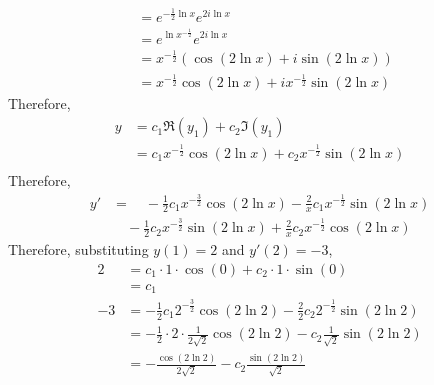 \documentclass[fleqn, a4paper, 11pt, oneside]{amsart}
\theoremstyle{definition}
\theoremstyle{theorem}
\begin{document}
\begin{solution}
\begin{enumerate}[leftmargin = *]
\begin{align*}
                                    & = e^{-\frac{1}{2} \ln x} e^{2 i \ln x}                             \\
                                    & = e^{\ln x^{-\frac{1}{2}}} e^{2 i \ln x}                           \\
                                    & = x^{-\frac{1}{2}} \left( \cos(2 \ln x) + i \sin (2 \ln x) \right) \\
                                    & = x^{-\frac{1}{2}} \cos(2 \ln x) + i x^{-\frac{1}{2}} \sin(2 \ln x)
			\end{align*}
			Therefore,
			\begin{align*}
				y & = c_1 \Re(y_1) + c_2 \Im(y_1)                                             \\
                                  & = c_1 x^{-\frac{1}{2}} \cos(2 \ln x) + c_2 x^{-\frac{1}{2}} \sin(2 \ln x) \\
			\end{align*}
			Therefore,
			\begin{align*}
				y' & = \quad -\frac{1}{2} c_1 x^{-\frac{3}{2}} \cos(2 \ln x) - \frac{2}{x} c_1 x^{-\frac{1}{2}} \sin(2 \ln x) \\
                                   & \quad -\frac{1}{2} c_2 x^{-\frac{3}{2}} \sin(2 \ln x) + \frac{2}{x} c_2 x^{-\frac{1}{2}} \cos(2 \ln x)
			\end{align*}
			Therefore, substituting $y(1) = 2$ and $y'(2) = -3$,
			\begin{align*}
				2                                                                       & = c_1 \cdot 1 \cdot \cos(0) + c_2 \cdot 1 \cdot \sin(0)                                                \\
                                                                                                        & = c_1                                                                                                  \\
				-3                                                                      & = -\frac{1}{2} c_1 2^{-\frac{3}{2}} \cos(2 \ln 2) - \frac{2}{2} c_2 2^{-\frac{1}{2}} \sin(2 \ln 2)     \\
                                                                                                        & = -\frac{1}{2} \cdot 2 \cdot \frac{1}{2 \sqrt{2}} \cos(2 \ln 2) - c_2 \frac{1}{\sqrt{2}} \sin(2 \ln 2) \\
                                                                                                        & = -\frac{\cos(2 \ln 2)}{2 \sqrt{2}} - c_2 \frac{\sin(2 \ln 2)}{\sqrt{2}}                               \\

\end{align*}
\end{enumerate}
\end{solution}
\end{document}
